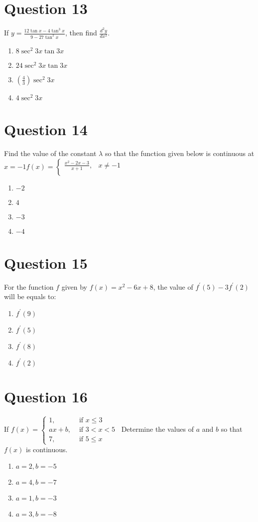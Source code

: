 \documentclass{article}
\begin{document}
\section*{Question 13}
If \(y=\frac{12 \tan x-4 \tan ^{3} x}{9-27 \tan ^{2} x}\), then find \(\frac{d^{2} y}{d x^{2}}\).\newline
\begin{enumerate}[label=(\alph*)]
\item \(8 \sec ^{2} 3 x \tan 3 x\)
\item \(24 \sec ^{2} 3 x \tan 3 x\)
\item \((\frac{4}{3}) \sec ^{2} 3 x\)
\item \(4 \sec ^{2} 3 x\)
\end{enumerate}
\newpage
\section*{Question 14}
Find the value of the constant \(\lambda\) so that the function given below is continuous at \(x=-1\)\(f(x)=\left\{\begin{array}{cc} \frac{x^2-2 x-3}{x+1}, & x \neq-1 \\ \end{array}\right.\)
\begin{enumerate}[label=(\alph*)]
\item \(-2\)
\item \(4\)
\item \(-3\)
\item \(-4\)
\end{enumerate}
\newpage
\section*{Question 15}
For the function \(f\) given by \(f(x)=x^2-6 x+8\), the value of \(f^{\prime}(5)-3 f^{\prime}(2)\) will be equals to:
\begin{enumerate}[label=(\alph*)]
\item \(f^{\prime}(9)\)
\item \(f^{\prime}(5)\)
\item \(f^{\prime}(8)\)
\item \(f^{\prime}(2)\)
\end{enumerate}
\newpage
\section*{Question 16}
If \(f(x)=\left\{\begin{array}{cl}1, & \text { if } x \leq 3 \\ a x+b, & \text { if } 3<x<5 \\ 7, & \text { if } 5 \leq x\end{array}\right.\) Determine the values of \(a\) and \(b\) so that \(f(x)\) is continuous.
\begin{enumerate}[label=(\alph*)]
\item \(a=2, b=-5\)
\item \(a=4, b=-7\)
\item \(a=1, b=-3\)
\item \(a=3, b=-8\)
\end{enumerate}
\newpage
\end{document}
